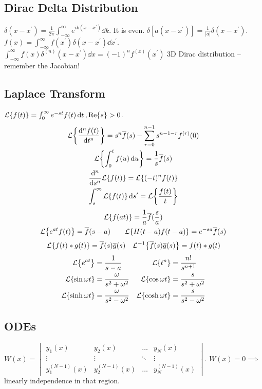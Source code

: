 \documentclass[8pt]{extarticle}
\newcommand{\Lt}[1]{ {\mathcal{L}\qty{#1}} }
\newcommand{\Lti}[1]{ {\mathcal{L}^{-1}\qty{#1}} }
\begin{document}
\begin{multicols*}{3}
\subsection{Dirac Delta Distribution}
$\delta(x-x^\prime) = \frac{1}{2\pi} \int_{-\infty}^\infty e^{ik(x-x^\prime)}
\dd{k}$. It is even. $\delta[a(x-x^\prime)] = \frac{1}{|a|}\delta(x-x^\prime)$.
$f(x) = \int_{-\infty}^\infty f(x^\prime) \delta(x-x^\prime) \dd{x^\prime}$.
$\int_{-\infty}^\infty f(x)\delta^{(n)}(x-x^\prime) \dd{x} = (-1)^n f^{(x)}
(x^\prime)$ 3D Dirac distribution -- remember the Jacobian!

\subsection{Laplace Transform}
$\Lt{f(t)} = \int_0^\infty e^{-st}f(t) \dd{t}, \Re{s}>0$.
\begin{gather*}
    \Lt{\dv[n]{f(t)}{t}} = s^n \overline f(s) - \sum_{r=0}^{n-1} s^{n-1-r}
        f^{(r)}(0) \\
    \Lt{\int_0^t f(u) \dd{u}} = \frac{1}{s} \overline f(s) \\
    \dv[n]{}{s}\Lt{f(t)} = \Lt{(-t)^n f(t)} \\
    \int_s^\infty \Lt{f(t)} \dd{s^\prime} = \Lt{\frac{f(t)}{t}}
\end{gather*}
\begin{gather*}
    \Lt{f(at)} = \frac{1}{a}\overline f(\frac{s}{a}) \\
    \Lt{e^{at}f(t)} = \overline f(s-a) \qquad
    \Lt{H(t-a)f(t-a)} = e^{-sa}\overline f(s)
\end{gather*}
\begin{align*}
    \Lt{f(t) * g(t)} &= \overline f(s) \overline g(s) &
    \Lti{\overline f(s) \overline g(s)} = f(t) * g(t)
\end{align*}
\begin{align*}
    \Lt{e^{at}} &= \frac{1}{s-a} & \Lt{t^n} &= \frac{n!}{s^{n+1}} \\
    \Lt{\sin \omega t} &= \frac{\omega}{s^2 + \omega^2} &
        \Lt{\cos \omega t} &= \frac{s}{s^2 + \omega^2} \\
    \Lt{\sinh \omega t} &= \frac{\omega}{s^2 - \omega^2} &
        \Lt{\cosh \omega t} &= \frac{s}{s^2 - \omega^2}
\end{align*}

\subsection{ODEs}
$W(x) = \begin{vmatrix}
    y_1(x) & y_2(x) & \ldots & y_N(x) \\
    \vdots & \vdots & \ddots & \vdots \\
    y^{(N-1)}_1(x) & y^{(N-1)}_2(x) & \ldots & y^{(N-1)}_N(x)
\end{vmatrix}$. $W(x) = 0 \implies $ linearly independence in that region.


\end{multicols*}
\end{document}
